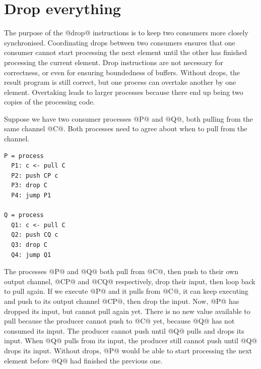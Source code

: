 
\section{Drop everything}

The purpose of the @drop@ instructions is to keep two consumers more closely synchronised.
Coordinating drops between two consumers ensures that one consumer cannot start processing the next element until the other has finished processing the current element.
Drop instructions are not necessary for correctness, or even for ensuring boundedness of buffers.
Without drops, the result program is still correct, but one process can overtake another by one element.
Overtaking leads to larger processes because there end up being two copies of the processing code.

Suppose we have two consumer processes @P@ and @Q@, both pulling from the same channel @C@.
Both processes need to agree about when to pull from the channel.

\begin{lstlisting}
P = process
  P1: c <- pull C
  P2: push CP c
  P3: drop C
  P4: jump P1

Q = process
  Q1: c <- pull C
  Q2: push CQ c
  Q3: drop C
  Q4: jump Q1
\end{lstlisting}

The processes @P@ and @Q@ both pull from @C@, then push to their own output channel, @CP@ and @CQ@ respectively, drop their input, then loop back to pull again.
If we execute @P@ and it pulls from @C@, it can keep executing and push to its output channel @CP@, then drop the input.
Now, @P@ has dropped its input, but cannot pull again yet.
There is no new value available to pull because the producer cannot push to @C@ yet, because @Q@ has not consumed its input.
The producer cannot push until @Q@ pulls and drops its input.
When @Q@ pulls from its input, the producer still cannot push until @Q@ drops its input.
Without drops, @P@ would be able to start processing the next element before @Q@ had finished the previous one.

